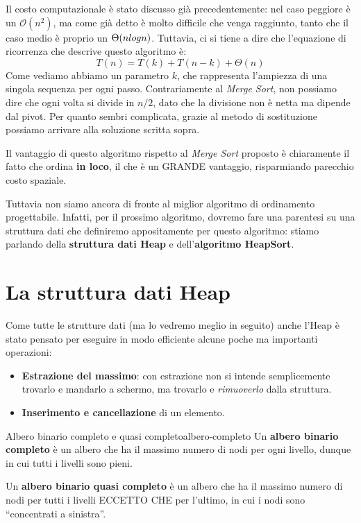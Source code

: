 \documentclass[12pt]{report}
\begin{document}
    Il costo computazionale è stato discusso già precedentemente: nel caso peggiore è un $\mathcal{O}(n^2)$, ma come già detto è molto difficile che venga raggiunto, tanto che il caso medio è proprio un $\Theta(n \\log n)$. Tuttavia, ci si tiene a dire che l'equazione di ricorrenza che descrive questo algoritmo è:
    \[
    T(n) = T(k) + T(n-k) + \Theta(n)
    \]
    Come vediamo abbiamo un parametro $k$, che rappresenta l'ampiezza di una singola sequenza per ogni passo. Contrariamente al \textit{Merge Sort}, non possiamo dire che ogni volta si divide in $n/2$, dato che la divisione non è netta ma dipende dal pivot. Per quanto sembri complicata, grazie al metodo di sostituzione possiamo arrivare alla soluzione scritta sopra.
    
    Il vantaggio di questo algoritmo rispetto al \textit{Merge Sort} proposto è chiaramente il fatto che ordina \textbf{in loco}, il che è un GRANDE vantaggio, risparmiando parecchio costo spaziale.
    
    Tuttavia non siamo ancora di fronte al miglior algoritmo di ordinamento progettabile. Infatti, per il prossimo algoritmo, dovremo fare una parentesi su una struttura dati che definiremo appositamente per questo algoritmo: stiamo parlando della \textbf{struttura dati Heap} e dell’\textbf{algoritmo HeapSort}.
    
    \newpage
    \section{La struttura dati Heap}
    Come tutte le strutture dati (ma lo vedremo meglio in seguito) anche l'Heap è stato pensato per eseguire in modo efficiente alcune poche ma importanti operazioni:
    \begin{itemize}
    	\item \textbf{Estrazione del massimo}: con estrazione non si intende semplicemente trovarlo e mandarlo a schermo, ma trovarlo e \textit{rimuoverlo} dalla struttura.
    	\item \textbf{Inserimento e cancellazione} di un elemento.
    \end{itemize}
    
    \begin{definizione}{Albero binario completo e quasi completo}{albero-completo}
    	Un \textbf{albero binario completo} è un albero che ha il massimo numero di nodi per ogni livello, dunque in cui tutti i livelli sono pieni. 
    	
    	Un \textbf{albero binario quasi completo} è un albero che ha il massimo numero di nodi per tutti i livelli ECCETTO CHE per l'ultimo, in cui i nodi sono ``concentrati a sinistra''.
    \end{definizione}
    
\end{document}
